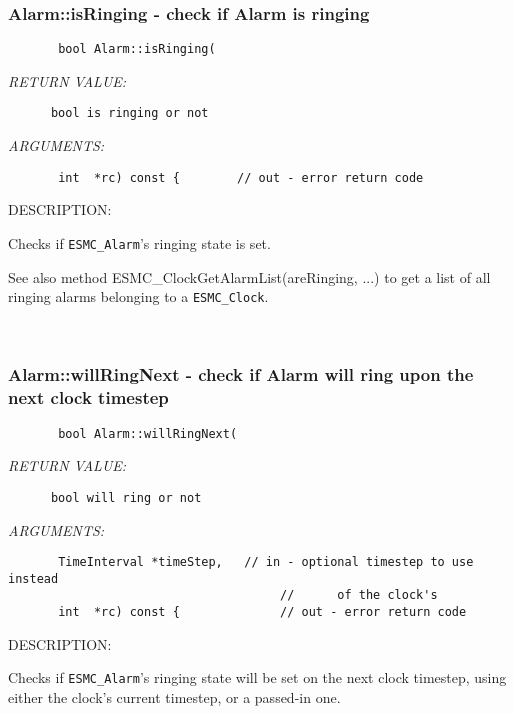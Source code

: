\subsubsection [Alarm::isRinging] {Alarm::isRinging - check if Alarm is ringing}


  
\begin{verbatim}       bool Alarm::isRinging(\end{verbatim}{\em RETURN VALUE:}
\begin{verbatim}      bool is ringing or not\end{verbatim}{\em ARGUMENTS:}
\begin{verbatim}       int  *rc) const {        // out - error return code\end{verbatim}
{\sf DESCRIPTION:\\ }


      Checks if {\tt ESMC\_Alarm}'s ringing state is set.
  
      See also method ESMC\_ClockGetAlarmList(areRinging, ...) to get
      a list of all ringing alarms belonging to a {\tt ESMC\_Clock}.
   
 
\mbox{}\hrulefill\ 
 
\subsubsection [Alarm::willRingNext] {Alarm::willRingNext - check if Alarm will ring upon the next clock timestep}


  
\begin{verbatim}       bool Alarm::willRingNext(\end{verbatim}{\em RETURN VALUE:}
\begin{verbatim}      bool will ring or not\end{verbatim}{\em ARGUMENTS:}
\begin{verbatim}       TimeInterval *timeStep,   // in - optional timestep to use instead
                                      //      of the clock's
       int  *rc) const {              // out - error return code\end{verbatim}
{\sf DESCRIPTION:\\ }


      Checks if {\tt ESMC\_Alarm}'s ringing state will be set on the next
      clock timestep, using either the clock's current timestep,
      or a passed-in one.
  
